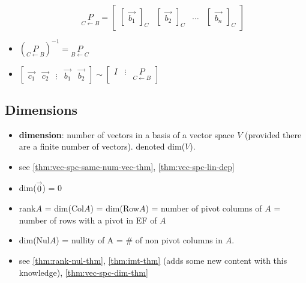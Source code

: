 \documentclass[a4paper,12pt]{article}
\theoremstyle{definition}
\theoremstyle{definition}
\newcommand{\basiscoordvec}[2]{
	\begin{bmatrix}
		\vec{#1}
	\end{bmatrix}_#2
}
\newcommand{\chngbasismat}[2]{
	\underset{#2 \leftarrow #1}{P}
}
\begin{document}
\begin{itemize}
		\begin{equation*}
			\chngbasismat{B}{C}
			=
			\begin{bmatrix}
				\basiscoordvec{b_1}{C} & \basiscoordvec{b_2}{C} & \ldots & \basiscoordvec{b_n}{C}
			\end{bmatrix}
		\end{equation*}
		
		\item $(\chngbasismat{B}{C})^{-1} = \chngbasismat{C}{B}$
		
		\item $\begin{bmatrix}
			\vec{c_1} & \vec{c_2} & \vdots & \vec{b_1} & \vec{b_2}
		\end{bmatrix}
		\sim
		\begin{bmatrix}
			I & \vdots & \chngbasismat{B}{C}
		\end{bmatrix}$
	\end{itemize}
	
	\subsection{Dimensions}
	\begin{itemize}
		\item \textbf{dimension}: number of vectors in a basis of a vector space $V$ (provided there are a finite number of vectors). denoted dim($V$).
		
		\item see \autoref{thm:vec-spc-same-num-vec-thm}, \autoref{thm:vec-spc-lin-dep}
		
		\item dim($\vec{0}$) = 0
		
		\item rank$A$ = dim(Col$A$) = dim(Row$A$) = number of pivot columns of $A$ = number of rows with a pivot in EF of $A$
		
		\item dim(Nul$A$) = nullity of A = \# of non pivot columns in $A$.
		
		\item see \autoref{thm:rank-nul-thm}, \autoref{thm:imt-thm} (adds some new content with this knowledge), \autoref{thm:vec-spc-dim-thm}
	\end{itemize}
	
\end{document}
